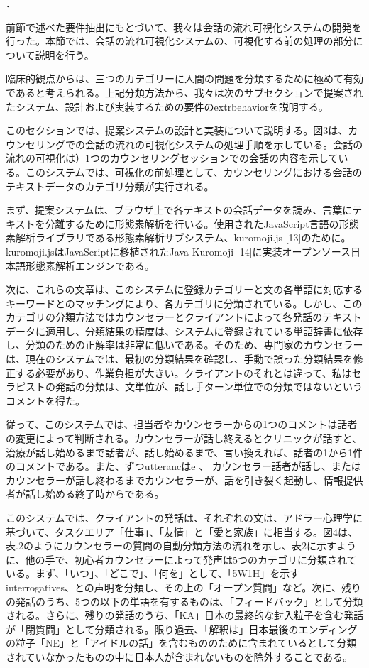 \documentclass[shuuron]{kuee}
\begin{document}
．






前節で述べた要件抽出にもとづいて、我々は会話の流れ可視化システムの開発を行った。本節では、会話の流れ可視化システムの、可視化する前の処理の部分について説明を行う。



  臨床的観点からは、三つのカテゴリーに人間の問題を分類するために極めて有効であると考えられる。上記分類方法から、我々は次のサブセクションで提案されたシステム、設計および実装するための要件のextrbehaviorを説明する。


  このセクションでは、提案システムの設計と実装について説明する。図3は、カウンセリングでの会話の流れの可視化システムの処理手順を示している。会話の流れの可視化は）1つのカウンセリングセッションでの会話の内容を示している。このシステムでは、可視化の前処理として、カウンセリングにおける会話のテキストデータのカテゴリ分類が実行される。


まず、提案システムは、ブラウザ上で各テキストの会話データを読み、言葉にテキストを分離するために形態素解析を行いる。使用されたJavaScript言語の形態素解析ライブラリである形態素解析サブシステム、kuromoji.js [13]のために。 kuromoji.jsはJavaScriptに移植されたJava Kuromoji [14]に実装オープンソース日本語形態素解析エンジンである。

  次に、これらの文章は、このシステムに登録カテゴリーと文の各単語に対応するキーワードとのマッチングにより、各カテゴリに分類されている。しかし、このカテゴリの分類方法ではカウンセラーとクライアントによって各発話のテキストデータに適用し、分類結果の精度は、システムに登録されている単語辞書に依存し、分類のための正解率は非常に低いである。そのため、専門家のカウンセラーは、現在のシステムでは、最初の分類結果を確認し、手動で誤った分類結果を修正する必要があり、作業負担が大きい。クライアントのそれとは違って、私はセラピストの発話の分類は、文単位が、話し手ターン単位での分類ではないというコメントを得た。


  従って、このシステムでは、担当者やカウンセラーからの1つのコメントは話者の変更によって判断される。カウンセラーが話し終えるとクリニックが話すと、治療が話し始めるまで話者が、話し始めるまで、言い換えれば、話者の1から1件のコメントである。また、ずつutterancはe  、 カウンセラー話者が話し、またはカウンセラーが話し終わるまでカウンセラーが、話を引き裂く起動し、情報提供者が話し始める終了時からである。

  このシステムでは、クライアントの発話は、それぞれの文は、アドラー心理学に基づいて、タスクエリア「仕事」、「友情」と「愛と家族」に相当する。図4は、表.2のようにカウンセラーの質問の自動分類方法の流れを示し、表2に示すように、他の手で、初心者カウンセラーによって発声は5つのカテゴリに分類されている。まず、「いつ」、「どこで」、「何を」として、「5W1H」を示すinterrogatives、との声明を分類し、その上の「オープン質問」など。次に、残りの発話のうち、5つの以下の単語を有するものは、「フィードバック」として分類される。さらに、残りの発話のうち、「KA」日本の最終的な封入粒子を含む発話が「閉質問」として分類される。限り過去、「解釈は」日本最後のエンディングの粒子「NE」と「アイドルの話」を含むもののために含まれているとして分類されていなかったものの中に日本人が含まれないものを除外することである。
\end{document}
